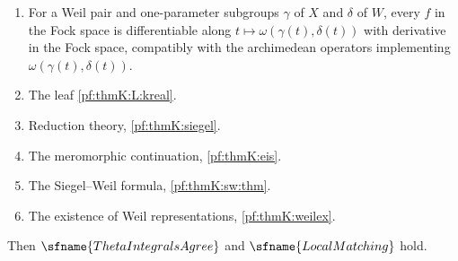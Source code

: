 \begin{theorem}
\begin{enumerate}[label=(H\arabic*),leftmargin=*]
\item\label{pf:thmK:H:archlie} For a Weil pair and one-parameter subgroups $\gamma$ of $X$ and $\delta$ of $W$, every $f$ in
the Fock space is differentiable along $t\mapsto\omega(\gamma(t),\delta(t))$ with derivative in the Fock space, compatibly
with the archimedean operators implementing $\omega(\gamma(t),\delta(t))$.
\item\label{pf:thmK:H:kreal} The leaf \ref{pf:thmK:L:kreal}.
\item\label{pf:thmK:H:siegel} Reduction theory, \cref{pf:thmK:siegel}.
\item\label{pf:thmK:H:eis} The meromorphic continuation, \cref{pf:thmK:eis}.
\item\label{pf:thmK:H:sw} The Siegel--Weil formula, \cref{pf:thmK:sw:thm}.
\item\label{pf:thmK:H:weilex} The existence of Weil representations, \cref{pf:thmK:weilex}.
\end{enumerate}
Then $\sfname{ThetaIntegralsAgree}$ and $\sfname{LocalMatching}$ hold.
\end{theorem}

